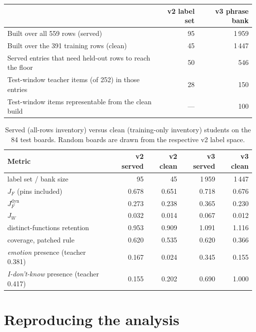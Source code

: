 \begin{table}[h]
\centering
\small
\begin{tabular}{@{}lrr@{}}
\toprule
 & v2 label set & v3 phrase bank \\
\midrule
Built over all 559 rows (served) & 95 & 1\,959 \\
Built over the 391 training rows (clean) & 45 & 1\,447 \\
Served entries that need held-out rows to reach the floor & 50 & 546 \\
Test-window teacher items (of 252) in those entries & 28 & 150 \\
Test-window items representable from the clean build & --- & 100 \\
\bottomrule
\end{tabular}
\end{table}

\begin{table}[h]
\centering
\footnotesize
\caption{Served (all-rows inventory) versus clean (training-only inventory)
students on the 84 test boards. Random boards are drawn from the
respective v2 label space.}
\label{tab:served}
\begin{tabular}{@{}lrrrr@{}}
\toprule
Metric & v2 served & v2 clean & v3 served & v3 clean \\
\midrule
label set / bank size & 95 & 45 & 1\,959 & 1\,447 \\
$J_F$ (pins included) & 0.678 & 0.651 & 0.718 & 0.676 \\
$J_F^{\mathrm{dyn}}$ & 0.273 & 0.238 & 0.365 & 0.230 \\
$J_W$ & 0.032 & 0.014 & 0.067 & 0.012 \\
distinct-functions retention & 0.953 & 0.909 & 1.091 & 1.116 \\
coverage, patched rule & 0.620 & 0.535 & 0.620 & 0.366 \\
\emph{emotion} presence (teacher 0.381) & 0.167 & 0.024 & 0.345 & 0.155 \\
\emph{I-don't-know} presence (teacher 0.417) & 0.155 & 0.202 & 0.690 & 1.000 \\
\bottomrule
\end{tabular}
\end{table}

\section{Reproducing the analysis}
\label{app:repro}


